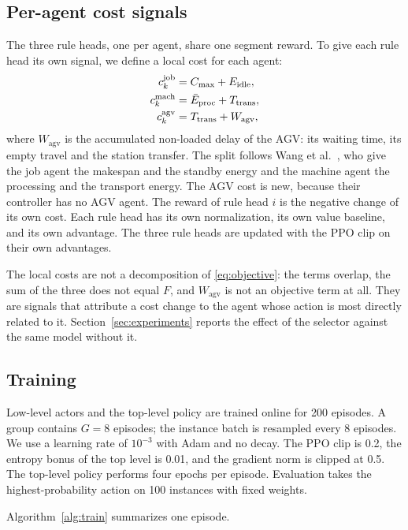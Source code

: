 \subsection{Per-agent cost signals}

The three rule heads, one per agent, share one segment reward. To give each
rule head its own signal, we define a local cost for each agent:
\begin{align}
c^{\mathrm{job}}_k &= C_{\max}+E_{\mathrm{idle}},\\
c^{\mathrm{mach}}_k &= \bar{E}_{\mathrm{proc}}+T_{\mathrm{trans}},\\
c^{\mathrm{agv}}_k &= T_{\mathrm{trans}}+W_{\mathrm{agv}},
\end{align}
where $W_{\mathrm{agv}}$ is the accumulated non-loaded delay of the AGV: its
waiting time, its empty travel and the station transfer. The split follows
Wang et al.~\cite{wang2025multitarget}, who give the job agent the makespan
and the standby energy and the machine agent the processing and the transport
energy. The AGV cost is new, because their controller has no AGV agent. The
reward of rule head $i$ is the negative change of its own cost. Each rule head
has its own normalization, its own value baseline, and its own advantage. The
three rule heads are updated with the PPO clip on their own advantages.

The local costs are not a decomposition of \eqref{eq:objective}: the terms
overlap, the sum of the three does not equal $F$, and $W_{\mathrm{agv}}$ is
not an objective term at all. They are signals that
attribute a cost change to the agent whose action is most directly related to
it. Section~\ref{sec:experiments} reports the effect of the selector against
the same model without it.

\subsection{Training}

Low-level actors and the top-level policy are trained online for 200
episodes. A group contains $G=8$ episodes; the instance batch is resampled
every 8 episodes. We use a learning rate of $10^{-3}$ with Adam and no
decay. The
PPO clip is 0.2, the entropy bonus of the top level is 0.01, and the gradient
norm is clipped at 0.5. The top-level policy performs four epochs per
episode. Evaluation takes the highest-probability action on 100 instances with fixed weights.


Algorithm~\ref{alg:train} summarizes one episode.

